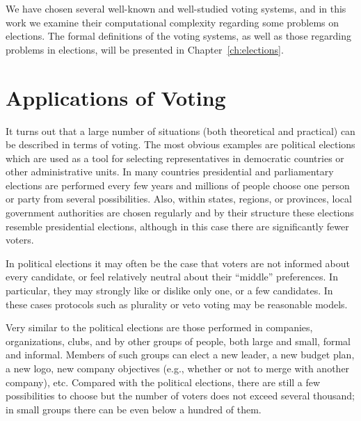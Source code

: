 We have chosen several well-known and well-studied voting systems, and in this work we examine their computational complexity regarding some problems on elections.
The formal definitions of the voting systems, as well as those regarding problems in elections, will be presented in Chapter~\ref{ch:elections}.

\section{Applications of Voting} \label{sec:applications}

It turns out that a large number of situations (both theoretical and practical) can be described in terms of voting.
The most obvious examples are political elections which are used as a tool for selecting representatives in democratic countries or other administrative units.
In many countries presidential and parliamentary elections are performed every few years and millions of people choose one person or party from several pos\-si\-bi\-li\-ties.
Also, within states, regions, or provinces, local government authorities are chosen regularly and by their structure these elections resemble presidential elections, although in this case there are significantly fewer voters.

In political elections it may often be the case that voters are not informed about every candidate, or feel relatively neutral about their ``middle'' preferences.
In particular, they may strongly like or dislike only one, or a few candidates.
In these cases protocols such as plurality or veto voting may be reasonable models.

Very similar to the political elections are those performed in companies, organizations, clubs, and by other groups of people, both large and small, formal and informal.
Members of such groups can elect a new leader, a new budget plan, a new logo, new company objectives (e.g., whether or not to merge with another company), etc.
Compared with the political elections, there are still a few possibilities to choose but the number of voters does not exceed several thousand; in small groups there can be even below a hundred of them.

